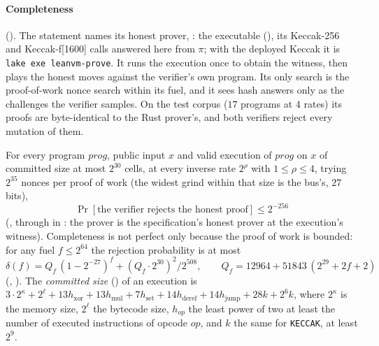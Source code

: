 \documentclass[11pt]{article}
\begin{document}
\paragraph{Completeness} (). The statement names its honest prover,
: the executable 
(), its Keccak-256 and Keccak-f[1600] calls answered here from $\pi$; with
the deployed Keccak it is \texttt{lake exe leanvm-prove}. It runs the execution once to obtain the
witness, then plays the honest moves against the verifier's own program. Its only search is the
proof-of-work nonce search within its fuel, and it sees hash answers only as the challenges the
verifier samples. On the test corpus ($17$ programs at $4$ rates) its proofs are byte-identical to
the Rust prover's, and both verifiers reject every mutation of them.

For every program $\mathit{prog}$, public input $x$ and valid execution of $\mathit{prog}$ on $x$ of committed size at
most $2^{30}$ cells, at every inverse rate $2^\rho$ with $1 \le \rho \le 4$, trying $2^{35}$ nonces
per proof of work (the widest grind within that size is the bus's, $27$ bits),
\[
\boxed{\ \Pr[\text{the verifier rejects the honest proof}] \le 2^{-256}\ }
\]
(, through  in : the prover is the
specification's honest prover at the execution's witness). Completeness is not perfect only
because the proof of work is bounded: for any fuel $f \le 2^{64}$ the rejection probability is at
most
\[
\delta(f) = Q_f\,(1-2^{-27})^{f} + (Q_f\cdot 2^{30})^2/2^{508}, \qquad
Q_f = 12964 + 51843\,(2^{29} + 2f + 2)
\]
(, ). The \emph{committed size} () of an
execution is
$3\cdot 2^{\kappa} + 2^{\ell} + 13h_{\mathrm{xor}} + 13h_{\mathrm{mul}} + 7h_{\mathrm{set}} +
14h_{\mathrm{deref}} + 14h_{\mathrm{jump}} + 28k + 2^6 k$, where $2^\kappa$ is the memory size,
$2^\ell$ the bytecode size, $h_{op}$ the least power of two at least the number of executed
instructions of opcode $op$, and $k$ the same for \texttt{KECCAK}, at least $2^9$.
\end{document}
